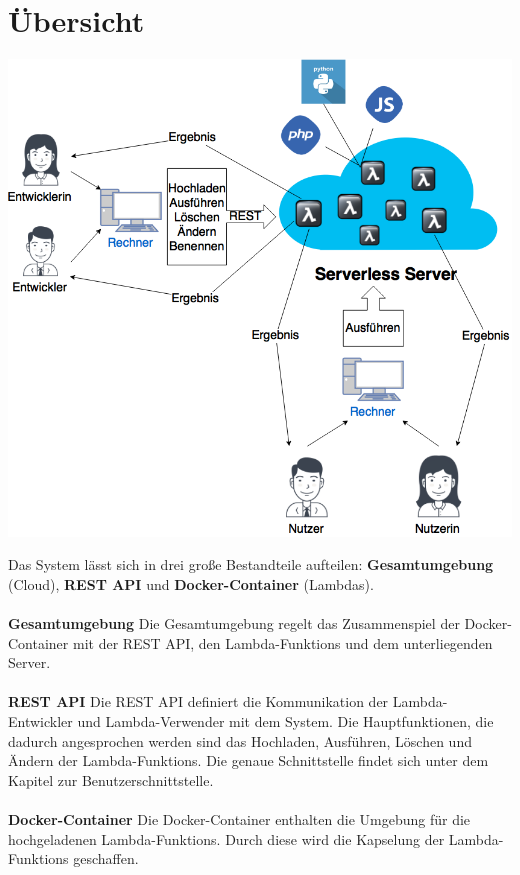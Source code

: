 \documentclass[a4paper,20pt,oneside]{book}
\begin{document}
\section{Übersicht}
 \begin{center}
 \includegraphics[width=11 cm]{Ubersicht.png}
 \end{center}

Das System lässt sich in drei große Bestandteile aufteilen: \textbf{Gesamtumgebung} (Cloud), \textbf{REST API} und \textbf{\Gls{Docker}-\Gls{Container}} (Lambdas).\\ \\
\textbf{Gesamtumgebung} Die Gesamtumgebung regelt das Zusammenspiel der \Gls{Docker}-\Gls{Container} mit der REST API, den \glspl{Lambda-Funktion} und dem unterliegenden Server.
\\ \\
\textbf{REST API} Die REST API definiert die Kommunikation der \gls{Lambda-Entwickler} und \gls{Lambda-Verwender} mit dem System. Die Hauptfunktionen, die dadurch angesprochen werden sind das Hochladen, Ausführen, Löschen und Ändern der \glspl{Lambda-Funktion}. Die genaue Schnittstelle findet sich unter dem Kapitel zur Benutzerschnittstelle.
\\ \\
\textbf{\Gls{Docker}-\Gls{Container}} Die \Gls{Docker}-\Gls{Container} enthalten die Umgebung für die hochgeladenen \glspl{Lambda-Funktion}. Durch diese wird die Kapselung der \glspl{Lambda-Funktion} geschaffen.
\\
\end{document}
